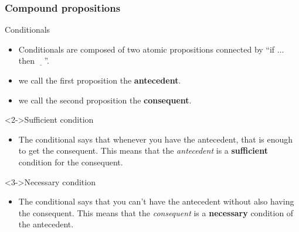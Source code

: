 \documentclass[10pt,letterpaper,xcolor=dvipsnames,handout]{beamer}
\begin{document}
\begin{frame}
\frametitle{Compound propositions}

\begin{block}{Conditionals}
\begin{itemize}
  \item Conditionals are composed of two atomic propositions connected by ``if $\ldots$ then $\underline{\;\;\;}$''.
  \item we call the first proposition the \textbf{antecedent}.
  \item we call the second proposition the \textbf{consequent}.
\end{itemize}
\end{block}

\begin{block}<2->{Sufficient condition}
\begin{itemize}
  \item The conditional says that whenever you have the antecedent, that is enough to get the consequent. This means that the \textit{antecedent} is a \textbf{sufficient} condition for the consequent.
\end{itemize}
\end{block}

\begin{block}<3->{Necessary condition}
\begin{itemize}
  \item The conditional says that you can't have the antecedent without also having the consequent. This means that the \textit{consequent} is a \textbf{necessary} condition of the antecedent.
\end{itemize}
\end{block}

\end{frame}
\end{document}
